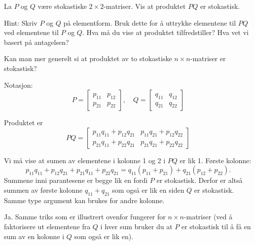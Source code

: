 \begin{oppgave}
\begin{punkt}
La $P$ og $Q$ være stokastiske $2\times 2$-matriser. Vis at produktet $PQ$ er stokastisk.

\noindent
Hint: Skriv $P$ og $Q$ på elementform. Bruk dette for å uttrykke elementene til $PQ$ ved elementene til $P$ og $Q$. Hva må du vise at produktet tilfredstiller? Hva vet vi basert på antagelsen?

\end{punkt}
\begin{punkt}
Kan man mer generelt si at produktet av to stokastiske $n\times n$-matriser er stokastisk?
\end{punkt}
\end{oppgave}

\begin{losning}

\begin{punkt}
Notasjon: $$P=\begin{bmatrix}
p_{11} & p_{12}\\
p_{21} & p_{22}
\end{bmatrix},\quad Q=\begin{bmatrix}
q_{11} & q_{12}\\
q_{21} & q_{22}
\end{bmatrix}$$

Produktet er $$PQ=\begin{bmatrix}
p_{11}q_{11}+p_{12}q_{21} & p_{11}q_{21}+p_{12}q_{22}\\
p_{21}q_{11}+p_{22}q_{21} & p_{21}q_{21}+p_{22}q_{22}
\end{bmatrix}$$
\end{punkt}

Vi må vise at sumen av elementene i kolonne 1 og 2 i $PQ$ er lik 1. Første kolonne: $$p_{11}q_{11}+p_{12}q_{21}+p_{21}q_{11}+p_{22}q_{21}=q_{11}(p_{11}+p_{21})+q_{21}(p_{12}+p_{22}).$$ Summene inni parantesene er begge lik en fordi $P$ er stokastisk. Derfor er altså summen av første kolonne $q_{11}+q_{21}$ som også er lik en siden $Q$ er stokastisk. Samme type argument kan brukes for andre kolonne.

\begin{punkt}
Ja. Samme triks som er illustrert ovenfor fungerer for $n\times n$-matriser (ved å faktorisere ut elementene fra $Q$ i hver sum bruker du at $P$ er stokastisk til å få en sum av en kolonne i $Q$ som også er lik en). 
\end{punkt}

\end{losning}
